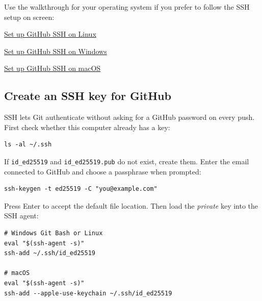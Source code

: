 Use the walkthrough for your operating system if you prefer to follow the SSH
setup on screen:

\begin{tcolorbox}[
  enhanced,
  breakable,
  colback=UTPPaleOrange,
  colframe=UTPOrange,
  colbacktitle=UTPOrange,
  boxrule=1pt,
  arc=2mm,
  title={Choose your operating system},
  fonttitle=\bfseries\color{white},
  left=3mm,right=3mm,top=2mm,bottom=2mm
]
\begin{description}[leftmargin=1.15in,style=nextline]
  \item[Linux]
    \href{https://youtu.be/AOM8CEyu3Ug?t=121}{Set up GitHub SSH on Linux}
  \item[Windows]
    \href{https://youtu.be/YT5YimhyX18?t=5}{Set up GitHub SSH on Windows}
  \item[macOS]
    \href{https://youtu.be/ACvE5Uy7ZB0?t=437}{Set up GitHub SSH on macOS}
\end{description}
\end{tcolorbox}

\subsection{Create an SSH key for GitHub}

SSH lets Git authenticate without asking for a GitHub password on every push.
First check whether this computer already has a key:

\begin{lstlisting}[style=utpterminal]
ls -al ~/.ssh
\end{lstlisting}

If \texttt{id\_ed25519} and \texttt{id\_ed25519.pub} do not exist, create them.
Enter the email connected to GitHub and choose a passphrase when prompted:

\begin{lstlisting}[style=utpterminal]
ssh-keygen -t ed25519 -C "you@example.com"
\end{lstlisting}

Press Enter to accept the default file location. Then load the \emph{private}
key into the SSH agent:

\begin{lstlisting}[style=utpterminal]
# Windows Git Bash or Linux
eval "$(ssh-agent -s)"
ssh-add ~/.ssh/id_ed25519

# macOS
eval "$(ssh-agent -s)"
ssh-add --apple-use-keychain ~/.ssh/id_ed25519
\end{lstlisting}

